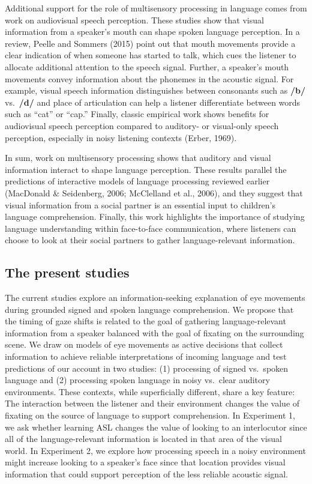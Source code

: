 \documentclass[,man,floatsintext]{apa6}
\begin{document}
Additional support for the role of multisensory processing in language comes from work on audiovisual speech perception. These studies show that visual information from a speaker's mouth can shape spoken language perception. In a review, Peelle and Sommers (2015) point out that mouth movements provide a clear indication of when someone has started to talk, which cues the listener to allocate additional attention to the speech signal. Further, a speaker's mouth movements convey information about the phonemes in the acoustic signal. For example, visual speech information distinguishes between consonants such as \textbf{/b/} vs.~\textbf{/d/} and place of articulation can help a listener differentiate between words such as \enquote{cat} or \enquote{cap.} Finally, classic empirical work shows benefits for audiovisual speech perception compared to auditory- or visual-only speech perception, especially in noisy listening contexts (Erber, 1969).

In sum, work on multisensory processing shows that auditory and visual information interact to shape language perception. These results parallel the predictions of interactive models of language processing reviewed earlier (MacDonald \& Seidenberg, 2006; McClelland et al., 2006), and they suggest that visual information from a social partner is an essential input to children's language comprehension. Finally, this work highlights the importance of studying language understanding within face-to-face communication, where listeners can choose to look at their social partners to gather language-relevant information.

\hypertarget{the-present-studies}{%
\subsection{The present studies}\label{the-present-studies}}

The current studies explore an information-seeking explanation of eye movements during grounded signed and spoken language comprehension. We propose that the timing of gaze shifts is related to the goal of gathering language-relevant information from a speaker balanced with the goal of fixating on the surrounding scene. We draw on models of eye movements as active decisions that collect information to achieve reliable interpretations of incoming language and test predictions of our account in two studies: (1) processing of signed vs.~spoken language and (2) processing spoken language in noisy vs.~clear auditory environments. These contexts, while superficially different, share a key feature: The interaction between the listener and their environment changes the value of fixating on the source of language to support comprehension. In Experiment 1, we ask whether learning ASL changes the value of looking to an interlocutor since all of the language-relevant information is located in that area of the visual world. In Experiment 2, we explore how processing speech in a noisy environment might increase looking to a speaker's face since that location provides visual information that could support perception of the less reliable acoustic signal.
\end{document}
